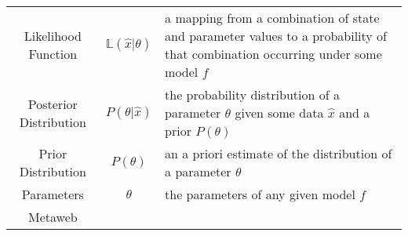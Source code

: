 \documentclass[]{article}
\begin{document}
\begin{longtable}[]{@{}ccl@{}}
\begin{minipage}[t]{0.25\columnwidth}\centering
Likelihood Function\strut
\end{minipage} & \begin{minipage}[t]{0.23\columnwidth}\centering
\(\mathbb{L}(\hat{x} | \theta)\)\strut
\end{minipage} & \begin{minipage}[t]{0.42\columnwidth}\raggedright
a mapping from a combination of state and parameter values to a
probability of that combination occurring under some model \(f\)\strut
\end{minipage}\tabularnewline
\begin{minipage}[t]{0.25\columnwidth}\centering
Posterior Distribution\strut
\end{minipage} & \begin{minipage}[t]{0.23\columnwidth}\centering
\(P(\theta | \hat{x})\)\strut
\end{minipage} & \begin{minipage}[t]{0.42\columnwidth}\raggedright
the probability distribution of a parameter \(\theta\) given some data
\(\hat{x}\) and a prior \(P(\theta)\)\strut
\end{minipage}\tabularnewline
\begin{minipage}[t]{0.25\columnwidth}\centering
Prior Distribution\strut
\end{minipage} & \begin{minipage}[t]{0.23\columnwidth}\centering
\(P(\theta)\)\strut
\end{minipage} & \begin{minipage}[t]{0.42\columnwidth}\raggedright
an a priori estimate of the distribution of a parameter \(\theta\)\strut
\end{minipage}\tabularnewline
\begin{minipage}[t]{0.25\columnwidth}\centering
Parameters\strut
\end{minipage} & \begin{minipage}[t]{0.23\columnwidth}\centering
\(\theta\)\strut
\end{minipage} & \begin{minipage}[t]{0.42\columnwidth}\raggedright
the parameters of any given model \(f\)\strut
\end{minipage}\tabularnewline
\begin{minipage}[t]{0.25\columnwidth}\centering
Metaweb\strut
\end{minipage} & \begin{minipage}[t]{0.23\columnwidth}\centering

\end{minipage}
\end{longtable}
\end{document}
